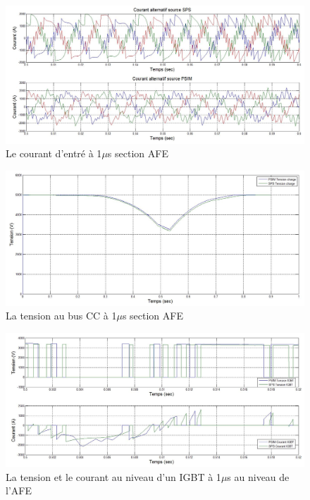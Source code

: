 \documentclass[11pt,letterpaper,final]{report}
\begin{document}
\begin{figure}[htb]
\centering
\includegraphics[scale=0.5]{Fig/Hach_AFE/1u/cour_al.jpg}
\caption{Le courant d'entré à 1$\mu$s section AFE}
\label{AF_HA_cou1}
\end{figure}


\begin{figure}[htb]
\centering
\includegraphics[scale=0.5]{Fig/Hach_AFE/1u/ten_bus.jpg}
\caption{La tension au bus CC à 1$\mu$s section AFE}
\label{AF_HA_vch1}
\end{figure}



\begin{figure}[htb]
\centering
\includegraphics[scale=0.5]{Fig/Hach_AFE/1u/IGBT_AFE.jpg}
\caption{La tension et le courant au niveau d'un IGBT à 1$\mu$s au niveau de l'AFE}
\label{AF_HA_IGBT1}
\end{figure}
\end{document}
